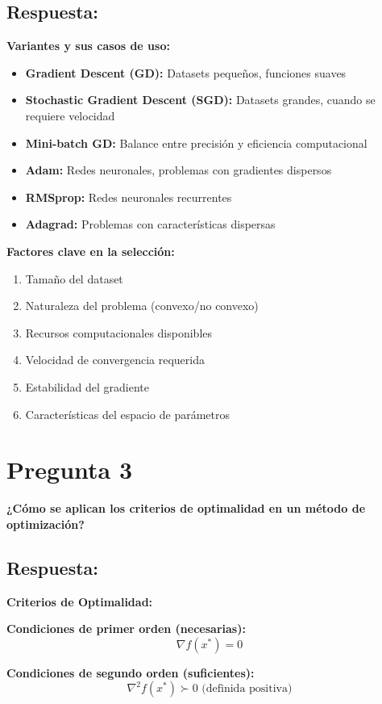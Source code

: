 \documentclass[12pt]{article}
\begin{document}
\subsection*{Respuesta:}

\textbf{Variantes y sus casos de uso:}
\begin{itemize}
    \item \textbf{Gradient Descent (GD):} Datasets pequeños, funciones suaves
    \item \textbf{Stochastic Gradient Descent (SGD):} Datasets grandes, cuando se requiere velocidad
    \item \textbf{Mini-batch GD:} Balance entre precisión y eficiencia computacional
    \item \textbf{Adam:} Redes neuronales, problemas con gradientes dispersos
    \item \textbf{RMSprop:} Redes neuronales recurrentes
    \item \textbf{Adagrad:} Problemas con características dispersas
\end{itemize}

\textbf{Factores clave en la selección:}
\begin{enumerate}
    \item Tamaño del dataset
    \item Naturaleza del problema (convexo/no convexo)
    \item Recursos computacionales disponibles
    \item Velocidad de convergencia requerida
    \item Estabilidad del gradiente
    \item Características del espacio de parámetros
\end{enumerate}

\section*{Pregunta 3}
\textbf{¿Cómo se aplican los criterios de optimalidad en un método de optimización?}

\subsection*{Respuesta:}

\textbf{Criterios de Optimalidad:}

\textbf{Condiciones de primer orden (necesarias):}
$$\nabla f(x^*) = 0$$

\textbf{Condiciones de segundo orden (suficientes):}
$$\nabla^2 f(x^*) \succ 0 \text{ (definida positiva)}$$
\end{document}

